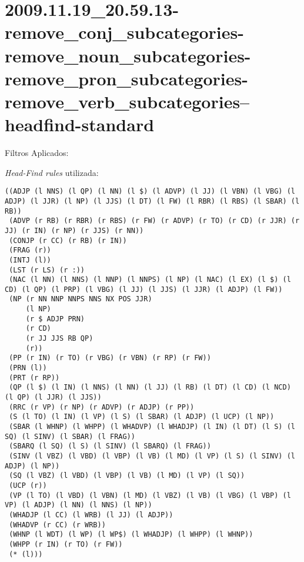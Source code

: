 \section{2009.11.19_20.59.13-remove_conj_subcategories-remove_noun_subcategories-remove_pron_subcategories-remove_verb_subcategories--headfind-standard} %
\label{sec:exp:2009.11.19_20.59.13-remove_conj_subcategories-remove_noun_subcategories-remove_pron_subcategories-remove_verb_subcategories--headfind-standard}

Filtros Aplicados:

\begin{itemize}
  
  \item{\emph{RemoveConjSubcategories}
  
  \item{\emph{RemoveNounSubcategories}
  
  \item{\emph{RemovePronSubcategories}
  
  \item{\emph{RemoveVerbSubcategories}
  
\end{itemize}

\emph{Head-Find rules} utilizada:

\scriptsize
\begin{verbatim}
((ADJP (l NNS) (l QP) (l NN) (l $) (l ADVP) (l JJ) (l VBN) (l VBG) (l ADJP) (l JJR) (l NP) (l JJS) (l DT) (l FW) (l RBR) (l RBS) (l SBAR) (l RB))
 (ADVP (r RB) (r RBR) (r RBS) (r FW) (r ADVP) (r TO) (r CD) (r JJR) (r JJ) (r IN) (r NP) (r JJS) (r NN))
 (CONJP (r CC) (r RB) (r IN))
 (FRAG (r))
 (INTJ (l))
 (LST (r LS) (r :))
 (NAC (l NN) (l NNS) (l NNP) (l NNPS) (l NP) (l NAC) (l EX) (l $) (l CD) (l QP) (l PRP) (l VBG) (l JJ) (l JJS) (l JJR) (l ADJP) (l FW))
 (NP (r NN NNP NNPS NNS NX POS JJR)
     (l NP)
     (r $ ADJP PRN)
     (r CD)
     (r JJ JJS RB QP)
     (r))
 (PP (r IN) (r TO) (r VBG) (r VBN) (r RP) (r FW))
 (PRN (l))
 (PRT (r RP))
 (QP (l $) (l IN) (l NNS) (l NN) (l JJ) (l RB) (l DT) (l CD) (l NCD) (l QP) (l JJR) (l JJS))
 (RRC (r VP) (r NP) (r ADVP) (r ADJP) (r PP))
 (S (l TO) (l IN) (l VP) (l S) (l SBAR) (l ADJP) (l UCP) (l NP))
 (SBAR (l WHNP) (l WHPP) (l WHADVP) (l WHADJP) (l IN) (l DT) (l S) (l SQ) (l SINV) (l SBAR) (l FRAG))
 (SBARQ (l SQ) (l S) (l SINV) (l SBARQ) (l FRAG))
 (SINV (l VBZ) (l VBD) (l VBP) (l VB) (l MD) (l VP) (l S) (l SINV) (l ADJP) (l NP))
 (SQ (l VBZ) (l VBD) (l VBP) (l VB) (l MD) (l VP) (l SQ))
 (UCP (r))
 (VP (l TO) (l VBD) (l VBN) (l MD) (l VBZ) (l VB) (l VBG) (l VBP) (l VP) (l ADJP) (l NN) (l NNS) (l NP))
 (WHADJP (l CC) (l WRB) (l JJ) (l ADJP))
 (WHADVP (r CC) (r WRB))
 (WHNP (l WDT) (l WP) (l WP$) (l WHADJP) (l WHPP) (l WHNP))
 (WHPP (r IN) (r TO) (r FW))
 (* (l)))

\end{verbatim}

